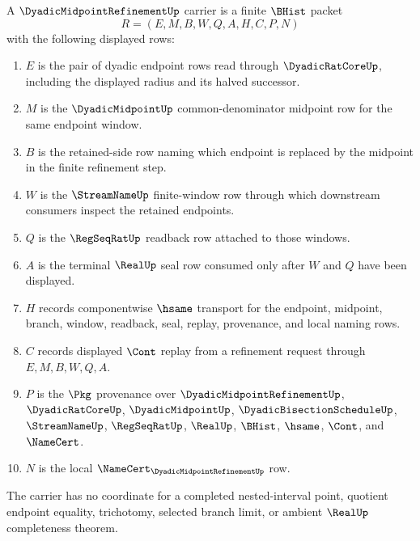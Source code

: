 \begin{definition}
\label{def:dyadic-midpoint-refinement-carrier}
A $\DyadicMidpointRefinementUp$ carrier is a finite $\BHist$ packet
$$
R=(E,M,B,W,Q,A,H,C,P,N)
$$
with the following displayed rows:
\begin{enumerate}
\item $E$ is the pair of dyadic endpoint rows read through $\DyadicRatCoreUp$, including the displayed radius and its halved successor.
\item $M$ is the $\DyadicMidpointUp$ common-denominator midpoint row for the same endpoint window.
\item $B$ is the retained-side row naming which endpoint is replaced by the midpoint in the finite refinement step.
\item $W$ is the $\StreamNameUp$ finite-window row through which downstream consumers inspect the retained endpoints.
\item $Q$ is the $\RegSeqRatUp$ readback row attached to those windows.
\item $A$ is the terminal $\RealUp$ seal row consumed only after $W$ and $Q$ have been displayed.
\item $H$ records componentwise $\hsame$ transport for the endpoint, midpoint, branch, window, readback, seal, replay, provenance, and local naming rows.
\item $C$ records displayed $\Cont$ replay from a refinement request through $E,M,B,W,Q,A$.
\item $P$ is the $\Pkg$ provenance over $\DyadicMidpointRefinementUp$, $\DyadicRatCoreUp$, $\DyadicMidpointUp$, $\DyadicBisectionScheduleUp$, $\StreamNameUp$, $\RegSeqRatUp$, $\RealUp$, $\BHist$, $\hsame$, $\Cont$, and $\NameCert$.
\item $N$ is the local $\NameCert_{\DyadicMidpointRefinementUp}$ row.
\end{enumerate}
The carrier has no coordinate for a completed nested-interval point, quotient endpoint equality, trichotomy, selected branch limit, or ambient $\RealUp$ completeness theorem.
\end{definition}

